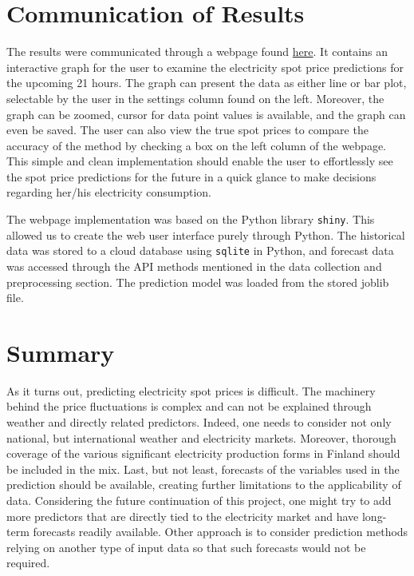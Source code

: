 \documentclass{article}
\numberwithin{equation}{section}
\begin{document}
\section{Communication of Results}
The results were communicated through a webpage found \href{https://connect.posit.cloud/AhsanAbbas101/content/0192c52c-7101-3655-bc34-0e4733cd46de}{here}. It contains an interactive graph for the user to examine the electricity spot price predictions for the upcoming 21 hours. The graph can present the data as either line or bar plot, selectable by the user in the settings column found on the left. Moreover, the graph can be zoomed, cursor for data point values is available, and the graph can even be saved. The user can also view the true spot prices to compare the accuracy of the method by checking a box on the left column of the webpage. This simple and clean implementation should enable the user to effortlessly see the spot price predictions for the future in a quick glance to make decisions regarding her/his electricity consumption.

The webpage implementation was based on the Python library \verb|shiny|. This allowed us to create the web user interface purely through Python. The historical data was stored to a cloud database using \verb|sqlite| in Python, and forecast data was accessed through the API methods mentioned in the data collection and preprocessing section. The prediction model was loaded from the stored joblib file.




\section{Summary}
As it turns out, predicting electricity spot prices is difficult. The machinery behind the price fluctuations is complex and can not be explained through weather and directly related predictors. Indeed, one needs to consider not only national, but international weather and electricity markets. Moreover, thorough coverage of the various significant electricity production forms in Finland should be included in the mix. Last, but not least, forecasts of the variables used in the prediction should be available, creating further limitations to the applicability of data. Considering the future continuation of this project, one might try to add more predictors that are directly tied to the electricity market and have long-term forecasts readily available. Other approach is to consider prediction methods relying on another type of input data so that such forecasts would not be required.
\end{document}
